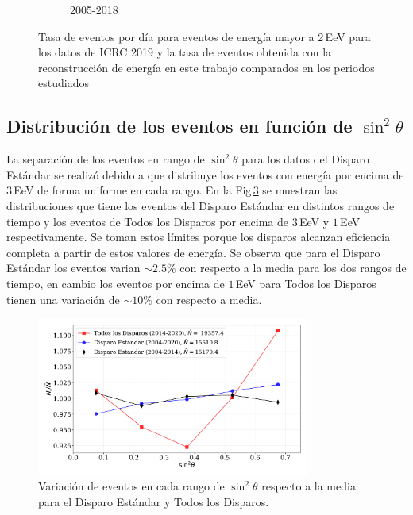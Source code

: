 \begin{figure}[H]
\begin{subfigure}[b]{0.75\textwidth}
      \caption{2005-2018}\label{fig:2EeV_expected_05_18}
      \end{subfigure}%
      \caption{Tasa de eventos por día para eventos de energía mayor a 2\,EeV para los datos de ICRC 2019 y la tasa de eventos obtenida con la reconstrucción de energía en este trabajo comparados en los periodos estudiados}\label{final}
\end{figure}


\subsection{Distribución de los eventos en función de $\sin^2\theta$}

La separación de los eventos en rango de $\sin^2\theta$ para los datos del Disparo Estándar se realizó debido a que distribuye los eventos con energía por encima de $3\,$EeV de forma uniforme en cada rango. En la Fig\,\ref{fig:bin_eventos_sin_2_theta} se muestran las distribuciones que tiene los eventos del Disparo Estándar en distintos rangos de tiempo y los eventos de Todos los Disparos por encima de $3\,$EeV y $1\,$EeV respectivamente. Se toman estos límites porque los disparos alcanzan eficiencia completa a partir de estos valores de energía.  Se observa que para el Disparo Estándar los eventos varian $\sim 2.5\%$ con respecto a la media para los dos rangos de tiempo, en cambio los eventos por encima de $1\,$EeV para Todos los Disparos tienen una variación de $\sim 10\%$ con respecto a media.

\begin{figure}[H]
  \begin{small}
    \begin{center}
      \includegraphics[width=0.8\textwidth]{bin_eventos_sin_2_theta.pdf}
    \end{center}
    \caption{Variación de eventos en cada rango de $\sin^2\theta$ respecto a la media para el Disparo Estándar y Todos los Disparos. }
    \label{fig:bin_eventos_sin_2_theta}
  \end{small}
\end{figure}
